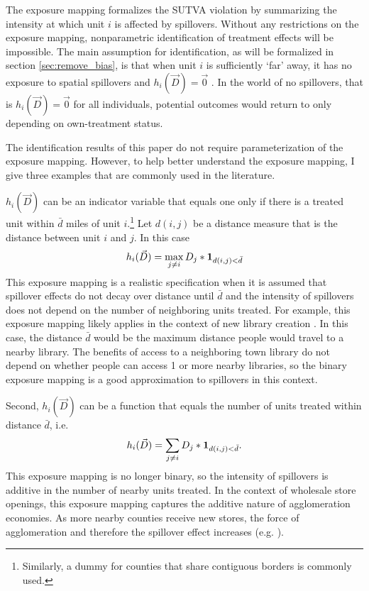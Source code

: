 \documentclass[11pt]{article}
\begin{document}
The exposure mapping formalizes the SUTVA violation by summarizing the intensity at which unit $i$ is affected by spillovers. Without any restrictions on the exposure mapping, nonparametric identification of treatment effects will be impossible. The main assumption for identification, as will be formalized in section \ref{sec:remove_bias}, is that when unit $i$ is sufficiently `far' away, it has no exposure to spatial spillovers and $h_i(\vec{D}) = \vec{0}$ . In the world of no spillovers, that is $h_i(\vec{D}) = \vec{0}$ for all individuals, potential outcomes would return to only depending on own-treatment status.

The identification results of this paper do not require parameterization of the exposure mapping. However, to help better understand the exposure mapping, I give three examples that are commonly used in the literature. 

\begin{example}
    $h_i(\vec{D})$ can be an indicator variable that equals one only if there is a treated unit within $\bar{d}$ miles of unit $i$.\footnote{Similarly, a dummy for counties that share contiguous borders is commonly used.} Let $d(i,j)$ be a distance measure that is the distance between unit $i$ and $j$.  In this case \begin{equation}\label{eq:h_within}
        h_i(\vec{D}) = \max_{j \neq i} D_j * \mathbf{1}_{ d(i,j) < \bar{d}}
    \end{equation}
    This exposure mapping is a realistic specification when it is assumed that spillover effects do not decay over distance until $\bar{d}$ and the intensity of spillovers does not depend on the number of neighboring units treated. For example, this exposure mapping likely applies in the context of new library creation \citep{Berkes_Nencka_2020}. In this case, the distance $\bar{d}$ would be the maximum distance people would travel to a nearby library. The benefits of access to a neighboring town library do not depend on whether people can access 1 or more nearby libraries, so the binary exposure mapping is a good approximation to spillovers in this context.  
\end{example}
    
\begin{example}
    Second, $h_i(\vec{D})$ can be a function that equals the number of units treated within distance $\bar{d}$, i.e. \begin{equation}\label{eq:h_within_additive}
        h_i(\vec{D}) = \sum_{j \neq i} D_j * \mathbf{1}_{d(i,j) < \bar{d}}.
    \end{equation}
    This exposure mapping is no longer binary, so the intensity of spillovers is additive in the number of nearby units treated. In the context of wholesale store openings, this exposure mapping captures the additive nature of agglomeration economies. As more nearby counties receive new stores, the force of agglomeration and therefore the spillover effect increases (e.g. \citet{Basker_2005}).
\end{example}
    
\end{document}
